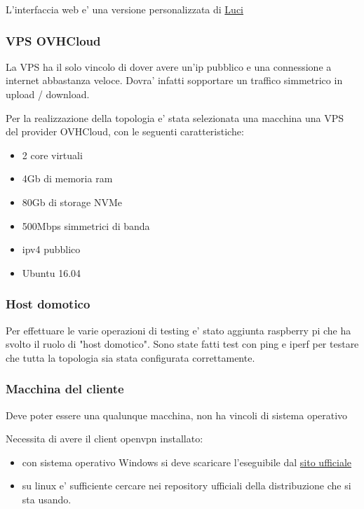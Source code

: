 L'interfaccia web e' una versione personalizzata di \href{https://openwrt.org/docs/guide-user/luci/start}{Luci}


\subsubsection{VPS OVHCloud}

La VPS ha il solo vincolo di dover avere un'ip pubblico e una connessione a internet abbastanza veloce. Dovra' infatti sopportare un traffico simmetrico in upload / download.

Per la realizzazione della topologia e' stata selezionata una macchina una VPS del provider OVHCloud, con le seguenti caratteristiche:

\begin{itemize}
	\item 2 core virtuali
	\item 4Gb di memoria ram
	\item 80Gb di storage NVMe
	\item 500Mbps simmetrici di banda
	\item ipv4 pubblico
	\item Ubuntu 16.04
\end{itemize}

\subsubsection{Host domotico}

Per effettuare le varie operazioni di testing e' stato aggiunta raspberry pi che ha svolto il ruolo di "host domotico". Sono state fatti test con ping e iperf per testare che tutta la topologia sia stata configurata correttamente.


\subsubsection{Macchina del cliente}

Deve poter essere una qualunque macchina, non ha vincoli di sistema operativo

Necessita di avere il client openvpn installato:

\begin{itemize}
	\item con sistema operativo Windows si deve scaricare l'eseguibile dal \href{https://openvpn.net/client-connect-vpn-for-windows/}{sito ufficiale}
	\item su linux e' sufficiente cercare nei repository ufficiali della distribuzione che si sta usando.
\end{itemize}